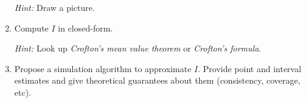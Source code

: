 \documentclass[a4paper,10pt, notitlepage]{report}
\begin{document}
\begin{enumerate}
 \textit{Hint:} Draw a picture.
 \item Compute $I$ in closed-form.

 \textit{Hint:} Look up \textit{Crofton's mean value theorem} or \textit{Crofton's formula}. 
 \item Propose a simulation algorithm to approximate $I$.
 Provide point and interval estimates and give theoretical guarantees about them (consistency, coverage, etc).
\end{enumerate}

% 
% 
% 
\end{document}
